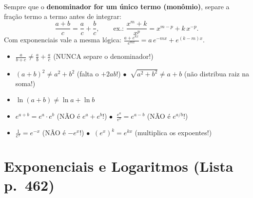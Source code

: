 \documentclass[10pt,a4paper]{article}
\begin{document}
\begin{dica}
    Sempre que o \textbf{denominador for um único termo (monômio)}, separe a fração termo a termo antes de integrar:
    \[
        \frac{a + b}{c} = \frac{a}{c} + \frac{b}{c}, \qquad \text{ex.: } \frac{x^m + k}{x^p} = x^{m-p} + k\,x^{-p}.
    \]
    Com exponenciais vale a mesma lógica: $\displaystyle \frac{a + e^{kx}}{e^{mx}} = a\,e^{-mx} + e^{(k-m)x}$.
\end{dica}

\begin{cuidado}
    \begin{itemize}
        \item $\displaystyle \frac{a}{b + c} \neq \frac{a}{b} + \frac{a}{c}$ \quad (NUNCA separe o denominador!)
        \item $(a + b)^2 \neq a^2 + b^2$ \quad (falta o $+2ab$!) \qquad $\bullet\;\; \sqrt{a^2 + b^2} \neq a + b$ \quad (não distribua raiz na soma!)
        \item $\ln(a + b) \neq \ln a + \ln b$
        \item $e^{a + b} = e^a \cdot e^b$ \quad (NÃO é $e^a + e^b$!) \qquad $\bullet\;\; \displaystyle \frac{e^a}{e^b} = e^{a - b}$ \quad (NÃO é $e^{a/b}$!)
        \item $\displaystyle \frac{1}{e^x} = e^{-x}$ \quad (NÃO é $-e^x$!) \qquad $\bullet\;\; (e^x)^k = e^{kx}$ \quad (multiplica os expoentes!)
    \end{itemize}
\end{cuidado}

\section{Exponenciais e Logaritmos (Lista p.\ 462)}
\end{document}
